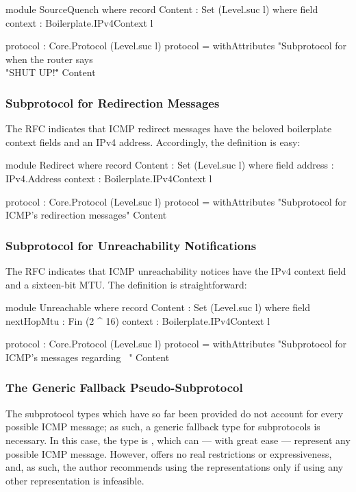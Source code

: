 \documentclass{report}
\begin{document}
\begin{itemize}
\begin{code}
    module SourceQuench where
      record Content : Set (Level.suc l) where
        field
          context : Boilerplate.IPv4Context l

      protocol : Core.Protocol (Level.suc l)
      protocol = withAttributes "Subprotocol for when the router says \
                                \\"SHUT UP!\""
                                Content
\end{code}

\subsubsection{Subprotocol for Redirection Messages}
The RFC indicates that ICMP redirect messages have the beloved boilerplate context fields and an IPv4 address.  Accordingly, the definition is easy:

\begin{code}
    module Redirect where
      record Content : Set (Level.suc l) where
        field
          address : IPv4.Address
          context : Boilerplate.IPv4Context l

      protocol : Core.Protocol (Level.suc l)
      protocol = withAttributes "Subprotocol for ICMP's redirection messages"
                                Content
\end{code}

\subsubsection{Subprotocol for Unreachability Notifications}
The RFC indicates that ICMP unreachability notices have the IPv4 context field and a sixteen-bit MTU.  The definition is straightforward:

\begin{code}
    module Unreachable where
      record Content : Set (Level.suc l) where
        field
          nextHopMtu : Fin (2 ^ 16)
          context : Boilerplate.IPv4Context l

      protocol : Core.Protocol (Level.suc l)
      protocol = withAttributes "Subprotocol for ICMP's messages regarding \
                                \unreachability"
                                Content
\end{code}

\subsubsection{The Generic Fallback Pseudo-Subprotocol}
The subprotocol types which have so far been provided do not account for every possible ICMP message; as such, a generic fallback type for subprotocols is necessary.  In this case, the type is , which can --- with great ease --- represent any possible ICMP message.  However,  offers no real restrictions or expressiveness, and, as such, the author recommends using the  representations only if using any other representation is infeasible.


\end{itemize}
\end{document}
